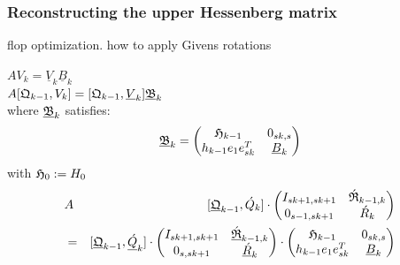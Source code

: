 \documentclass{scrartcl}
\numberwithin{equation}{section}
\begin{document}
\subsubsection{Reconstructing the upper Hessenberg matrix}
flop optimization. how to apply Givens rotations

$AV_k = \underline{V}_k\underline{B}_k$ \\

$A [\frak{Q}_{k - 1}, V_k] = [\frak{Q}_{k - 1}, \underline{V}_k]\underline{\frak{B}}_k$ \\

where $\underline{\frak{B}}_k$ satisfies:
\begin{equation} \label{eq:B_blackletter_k_}
\underline{\frak{B}}_k = 
\begin{pmatrix}
	\frak{H}_{k - 1} & 0_{sk, s} \\
	h_{k - 1} e_1 e^T_{sk} & \underline{B}_k \\
\end{pmatrix}
\end{equation}
with $\frak{H}_0 := H_0$ \\

\begin{eqnarray*}
&A& [\underline{\frak{Q}}_{k - 1}, \acute{Q}_k] \cdot 
\begin{pmatrix}
	I_{sk + 1, sk + 1} & \acute{\frak{R}}_{k - 1, k} \\
	0_{s - 1, sk + 1} &\acute{R}_k \\
\end{pmatrix} \\
&=& [ \underline{\frak{Q}}_{k - 1}, \underline{\acute{Q}}_k ] \cdot 
\begin{pmatrix}
	I_{sk + 1, sk + 1} & \underline{\acute{\frak{R}}}_{k - 1, k} \\
	0_{s, sk + 1} & \underline{\acute{R}}_k \\
\end{pmatrix} \cdot
\begin{pmatrix}
	\frak{H}_{k - 1} & 0_{sk, s} \\
	h_{k - 1} e_1 e^T_{sk} & \underline{B}_k \\
\end{pmatrix}
\end{eqnarray*}
\end{document}
